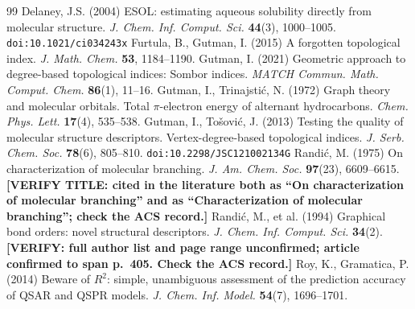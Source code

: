 \documentclass[11pt,a4paper]{article}
\theoremstyle{plain}
\begin{document}
\begin{thebibliography}{99}
 Delaney, J.S. (2004) ESOL: estimating aqueous
solubility directly from molecular structure. \emph{J. Chem. Inf. Comput. Sci.}
\textbf{44}(3), 1000--1005. \texttt{doi:10.1021/ci034243x}
 Furtula, B., Gutman, I. (2015) A forgotten
topological index. \emph{J. Math. Chem.} \textbf{53}, 1184--1190.
 Gutman, I. (2021) Geometric approach to degree-based
topological indices: Sombor indices. \emph{MATCH Commun. Math. Comput. Chem.}
\textbf{86}(1), 11--16.
 Gutman, I., Trinajsti\'c, N. (1972)
Graph theory and molecular orbitals. Total $\pi$-electron energy of alternant
hydrocarbons. \emph{Chem. Phys. Lett.} \textbf{17}(4), 535--538.
 Gutman, I., To\v{s}ovi\'c, J. (2013)
Testing the quality of molecular structure descriptors. Vertex-degree-based topological
indices. \emph{J. Serb. Chem. Soc.} \textbf{78}(6), 805--810.
\texttt{doi:10.2298/JSC121002134G}
 Randi\'c, M. (1975) On characterization of molecular
branching. \emph{J. Am. Chem. Soc.} \textbf{97}(23), 6609--6615.
\textbf{[VERIFY TITLE: cited in the literature both as ``On characterization of molecular
branching'' and as ``Characterization of molecular branching''; check the ACS record.]}
 Randi\'c, M., et al. (1994) Graphical bond
orders: novel structural descriptors. \emph{J. Chem. Inf. Comput. Sci.} \textbf{34}(2).
\textbf{[VERIFY: full author list and page range unconfirmed; article confirmed to span
p.~405. Check the ACS record.]}
 Roy, K., Gramatica, P. (2014) Beware of $R^2$:
simple, unambiguous assessment of the prediction accuracy of QSAR and QSPR models.
\emph{J. Chem. Inf. Model.} \textbf{54}(7), 1696--1701.
\end{thebibliography}
\end{document}
